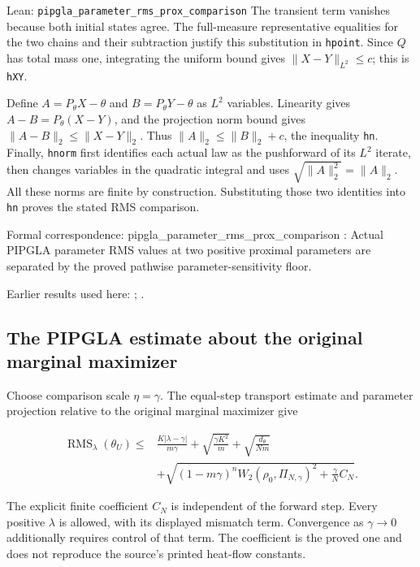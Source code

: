 \documentclass[11pt,a4paper]{report}
\begin{document}
\begin{leanbox}{Lean: \texttt{pipgla\_\allowbreak{}parameter\_\allowbreak{}rms\_\allowbreak{}prox\_\allowbreak{}comparison}}
The transient term vanishes because both initial states agree. The full-measure representative equalities for the two chains and their subtraction justify this substitution in \texttt{hpoint}. Since \(Q\) has total mass one, integrating the uniform bound gives \(\|X-Y\|_{L^2}\le c\); this is \texttt{h\allowbreak{}XY}.



Define \(A=P_\theta X-\theta\) and \(B=P_\theta Y-\theta\) as \(L^2\) variables. Linearity gives \(A-B=P_\theta(X-Y)\), and the projection norm bound gives \(\|A-B\|_2\le\|X-Y\|_2\). Thus \(\|A\|_2\le\|B\|_2+c\), the inequality \texttt{hn}. Finally, \texttt{hnorm} first identifies each actual law as the pushforward of its \(L^2\) iterate, then changes variables in the quadratic integral and uses \(\sqrt{\|A\|_2^2}=\|A\|_2\). All these norms are finite by construction. Substituting those two identities into \texttt{hn} proves the stated RMS comparison.



Formal correspondence: pipgla\_parameter\_rms\_prox\_comparison : Actual PIPGLA parameter RMS values at two positive proximal parameters are separated by the proved pathwise parameter-sensitivity floor.
\end{leanbox}


Earlier results used here: \cite[Section~3.1.1]{LangevinLean2026IPLA}; \cite[Section~3.1.6]{LangevinLean2026IPLA}.
\subsection{\texorpdfstring{The PIPGLA estimate about the original marginal maximizer}{The PIPGLA estimate about the original marginal maximizer}}
\label{report-step-ProximalLangevin-SplittingTheorem-lean-2}


Choose comparison scale \(\eta=\gamma\). The equal-step transport estimate and parameter projection relative to the original marginal maximizer give

\[\begin{aligned}\operatorname{RMS}_\lambda(\theta_U)\le{}&\frac{K|\lambda-\gamma|}{m\gamma}+\sqrt{\frac{\gamma K^2}{m}}+\sqrt{\frac{d_\theta}{Nm}}\\&+\sqrt{(1-m\gamma)^nW_2(\rho_0,\Pi_{N,\gamma})^2+\frac\gamma N C_N}.\end{aligned}\]

The explicit finite coefficient \(C_N\) is independent of the forward step. Every positive \(\lambda\) is allowed, with its displayed mismatch term. Convergence as \(\gamma\to0\) additionally requires control of that term. The coefficient is the proved one and does not reproduce the source’s printed heat-flow constants.
\end{document}
